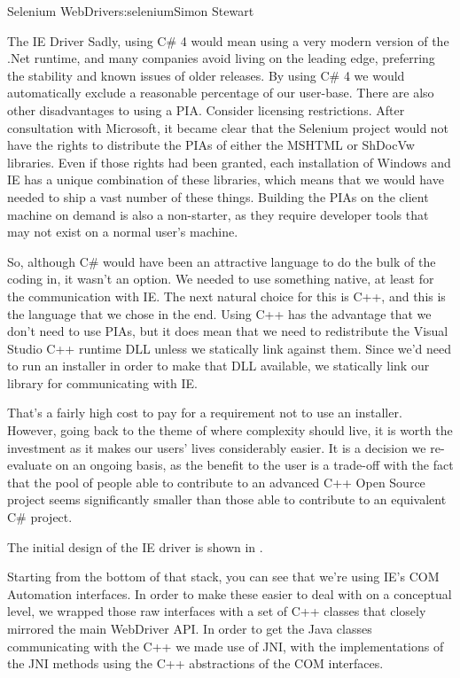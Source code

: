 \begin{aosachapter}{Selenium WebDriver}{s:selenium}{Simon Stewart}
\begin{aosasect1}{The IE Driver}
Sadly, using C\# 4 would mean using a very modern version of the .Net
runtime, and many companies avoid living on the leading edge,
preferring the stability and known issues of older releases. By using
C\# 4 we would automatically exclude a reasonable percentage of our
user-base. There are also other disadvantages to using a PIA\@. Consider
licensing restrictions.  After consultation with Microsoft, it became
clear that the Selenium project would not have the rights to
distribute the PIAs of either the MSHTML or ShDocVw libraries. Even if
those rights had been granted, each installation of Windows and IE has
a unique combination of these libraries, which means that we would
have needed to ship a vast number of these things. Building the PIAs
on the client machine on demand is also a non-starter, as they require
developer tools that may not exist on a normal user's machine.

So, although C\# would have been an attractive language to do the bulk
of the coding in, it wasn't an option. We needed to use something
native, at least for the communication with IE\@. The next natural
choice for this is C++, and this is the language that we chose in the
end. Using C++ has the advantage that we don't need to use PIAs, but
it does mean that we need to redistribute the Visual Studio C++
runtime DLL unless we statically link against them.  Since we'd need
to run an installer in order to make that DLL available, we statically
link our library for communicating with IE.

That's a fairly high cost to pay for a requirement not to use an
installer. However, going back to the theme of where complexity should
live, it is worth the investment as it makes our users' lives
considerably easier. It is a decision we re-evaluate on an ongoing
basis, as the benefit to the user is a trade-off with the fact that
the pool of people able to contribute to an advanced C++ Open Source
project seems significantly smaller than those able to contribute to
an equivalent C\# project.

The initial design of the IE driver is shown in
.


Starting from the bottom of that stack, you can see that we're using
IE's COM Automation interfaces.  In order to make these easier to deal
with on a conceptual level, we wrapped those raw interfaces with a set
of C++ classes that closely mirrored the main WebDriver API\@. In order
to get the Java classes communicating with the C++ we made use of JNI,
with the implementations of the JNI methods using the C++ abstractions
of the COM interfaces.


\end{aosasect1}
\end{aosachapter}
